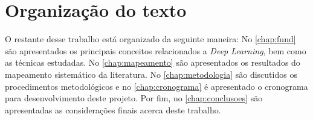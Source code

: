 \section{Organização do texto}
\label{sec:organizacao}

O restante desse trabalho está organizado da seguinte maneira: No \autoref{chap:fund} são apresentados os principais conceitos relacionados a \emph{Deep Learning}, bem como as técnicas estudadas. No \autoref{chap:mapeamento} são apresentados os resultados do mapeamento sistemático da literatura. No \autoref{chap:metodologia} são discutidos os procedimentos metodológicos e no \autoref{chap:cronograma} é apresentado o cronograma para desenvolvimento deste projeto. Por fim, no \autoref{chap:conclusoes} são apresentadas as considerações finais acerca deste trabalho.

